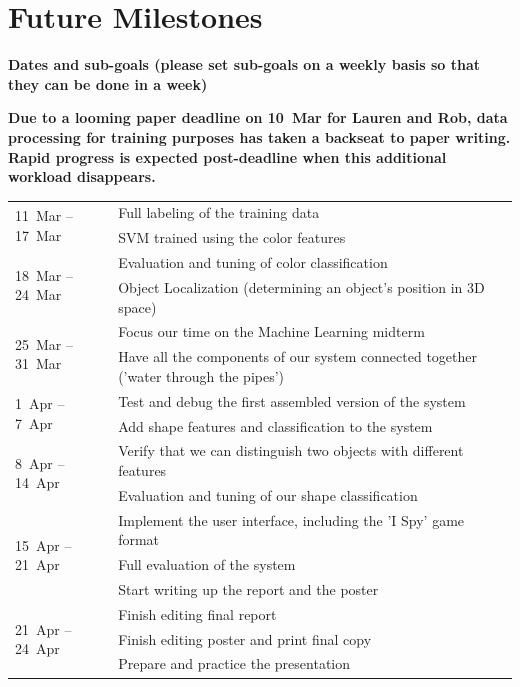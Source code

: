 \documentclass[11pt]{article}
\newcommand{\xxx}[1]{{\bf \color{red} #1}}
\newcommand{\meh}[1]{{\bf \color{blue} #1}}
\newcommand\T{\rule{0pt}{3ex}}
\newcommand\B{\rule[-1.2ex]{0pt}{0pt}}
\begin{document}
\section{Future Milestones}
\xxx{Dates and sub-goals (please set sub-goals on a weekly basis so that they
    can be done in a week)}

\meh{Due to a looming paper deadline on 10~Mar for Lauren and Rob, data
    processing for training purposes has taken a backseat to paper writing.
    Rapid progress is expected post-deadline when this additional workload
    disappears.}

\begin{center}
    \begin{tabular}{ | l | l |}
    \hline
    \multirow{2}{*}{11~Mar -- 17~Mar} 
	& Full labeling of the training data \T \\
	& SVM trained using the color features \B \\ 
    \hline
    \multirow{2}{*}{18~Mar -- 24~Mar} 
	& Evaluation and tuning of color classification \T \\ 
	& Object Localization (determining an object's position in 3D space) \B \\ 
    \hline
    \multirow{2}{*}{25~Mar -- 31~Mar} 
	& Focus our time on the Machine Learning midterm \T\\
	& Have all the components of our system connected together ('water through the pipes') \B \\ 
    \hline
    \multirow{2}{*}{1~Apr -- 7~Apr} 
	& Test and debug the first assembled version of the system \T \\
	& Add shape features and classification to the system \B\\ 
    \hline
    \multirow{2}{*}{8~Apr -- 14~Apr} 
	& Verify that we can distinguish two objects with different features \T\\
	& Evaluation and tuning of our shape classification \B \\ 
    \hline
    \multirow{3}{*}{15~Apr -- 21~Apr} 
	& Implement the user interface, including the 'I Spy' game format \T\\
	& Full evaluation of the system \\ 
	& Start writing up the report and the poster \B \\
    \hline
    \multirow{3}{*}{21~Apr -- 24~Apr} 
	& Finish editing final report \T \\
	& Finish editing poster and print final copy \\ 
	& Prepare and practice the presentation \B \\
    \hline
    \end{tabular}
\end{center}
\end{document}
